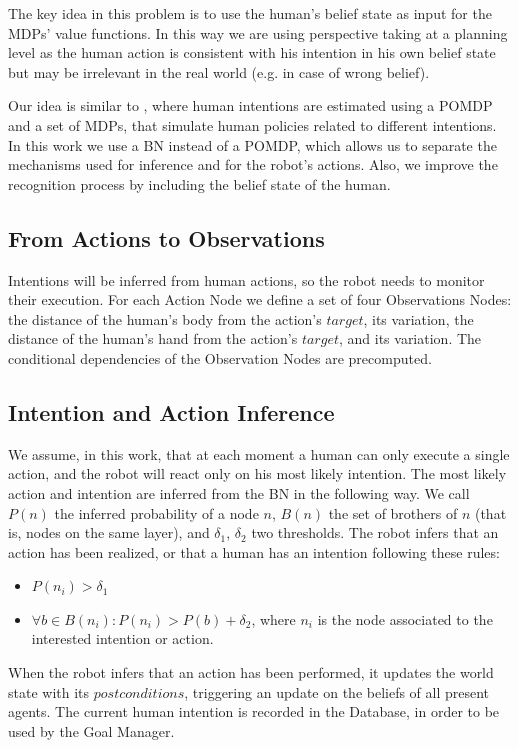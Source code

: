 The key idea in this problem is to use the human's belief state as input for the MDPs' value functions. In this way we are using perspective taking at a planning level as the human action is consistent with his intention in his own belief state but may be irrelevant in the real world (e.g. in case of wrong belief).

Our idea is similar to \cite{karami2010human}, where human intentions are estimated using a POMDP and a set of MDPs, that simulate human policies related to different intentions. In this work we use a BN instead of a POMDP, which allows us to separate the mechanisms used for inference and for the robot's actions. Also, we improve the recognition process by including the belief state of the human.

\subsection{From Actions to Observations}
Intentions will be inferred from human actions, so the robot needs to monitor their execution. For each Action Node we define a set of four Observations Nodes: the distance of the human's body from the action's $target$, its variation, the distance of the human's hand from the action's $target$, and its variation. The conditional dependencies of the Observation Nodes are precomputed.

\subsection{Intention and Action Inference}
\label{sec:situation_assessment-intention and action inference}
We assume, in this work, that at each moment a human can only execute a single action, and the robot will react only on his most likely intention. The most likely action and intention are inferred from the BN in the following way. We call $P(n)$ the inferred probability of a node $n$, $B(n)$ the set of brothers of $n$ (that is, nodes on the same layer), and $\delta_1$, $\delta_2$ two thresholds. The robot infers that an action has been realized, or that a human has an intention following these rules: 
\begin{itemize}
\item  \(P(n_i)>\delta_1\) 
\item  \(\forall b \in B(n_i): P(n_i)>P(b)+\delta_2\), where $n_i$ is the node associated to the interested intention or action.
\end{itemize}

When the robot infers that an action has been performed, it updates the world state with its $postconditions$, triggering an update on the beliefs of all present agents. The current human intention is recorded in the Database, in order to be used by the Goal Manager.



